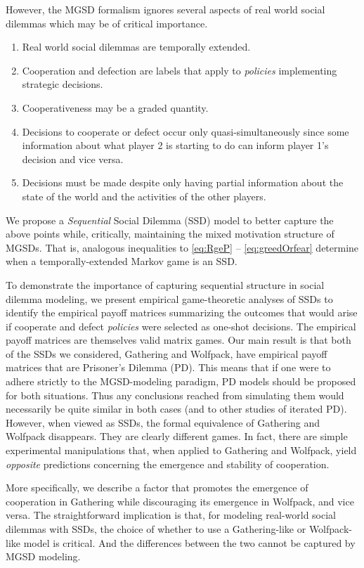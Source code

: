\documentclass{aamas2017}
\begin{document}
However, the MGSD formalism ignores several aspects of real world social dilemmas which may be of critical importance.
\begin{enumerate}
 \item Real world social dilemmas are temporally extended.
 \item Cooperation and defection are labels that apply to \emph{policies} implementing strategic decisions.
 \item Cooperativeness may be a graded quantity.
 \item Decisions to cooperate or defect occur only quasi\hyp{}simultaneously since some information about what player 2 is starting to do can inform player 1's decision and vice versa.
 \item Decisions must be made despite only having partial information about the state of the world and the activities of the other players.
\end{enumerate}

We propose a \emph{Sequential} Social Dilemma (SSD) model to better capture the above points while, critically, maintaining the mixed motivation structure of MGSDs. That is, analogous inequalities to \eqref{eq:RgeP} -- \eqref{eq:greedOrfear} determine when a temporally-extended Markov game is an SSD.

To demonstrate the importance of capturing sequential structure in social dilemma modeling, we present empirical game-theoretic analyses  \cite{walsh2002analyzing, Wellman06} of SSDs to identify the empirical payoff matrices summarizing the outcomes that would arise if cooperate and defect \emph{policies} were selected as one-shot decisions. The empirical payoff matrices are themselves valid matrix games. Our main result is that both of the SSDs we considered, Gathering and Wolfpack, have empirical payoff matrices that are Prisoner's Dilemma (PD). This means that if one were to adhere strictly to the MGSD-modeling paradigm, PD models should be proposed for both situations. Thus any conclusions reached from simulating them would necessarily be quite similar in both cases (and to other studies of iterated PD). However, when viewed as SSDs, the formal equivalence of Gathering and Wolfpack disappears. They are clearly different games. In fact, there are simple experimental manipulations that, when applied to Gathering and Wolfpack, yield \emph{opposite} predictions concerning the emergence and stability of cooperation.

More specifically, we describe a factor that promotes the emergence of cooperation in Gathering while discouraging its emergence in Wolfpack, and vice versa. The straightforward implication is that, for modeling real-world social dilemmas with SSDs, the choice of whether to use a Gathering-like or Wolfpack-like model is critical. And the differences between the two cannot be captured by MGSD modeling.
\end{document}
